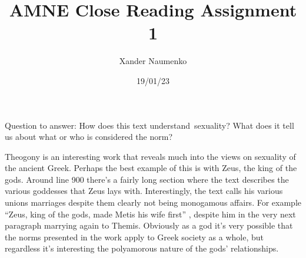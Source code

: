 \documentclass[letterpaper, reqno,11pt]{article}
\begin{document}
\title{AMNE Close Reading Assignment 1}
\date{19/01/23}
\author{Xander Naumenko}
\maketitle


Question to answer: How does this text understand sexuality? What does it tell us about what or who is considered the norm?  

Theogony is an interesting work that reveals much into the views on sexuality of the ancient Greek. Perhaps the best example of this is with Zeus, the king of the gods. Around line 900 there's a fairly long section where the text describes the various goddesses that Zeus lays with. Interestingly, the text calls his various unions marriages despite them clearly not being monogamous affairs. For example ``Zeus, king of the gods, made Metis his wife first'' \cite{theogony}, despite him in the very next paragraph marrying again to Themis. Obviously as a god it's very possible that the norms presented in the work apply to Greek society as a whole, but regardless it's interesting the polyamorous nature of the gods' relationships. 


\medskip

\printbibliography
\end{document}
